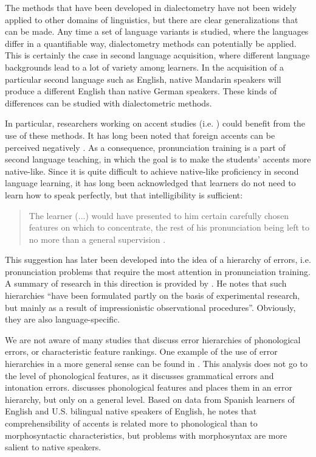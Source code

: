 \documentclass[output=paper]{LSP/langsci}
\begin{document}
The methods that have been developed in dialectometry have not been widely applied to other domains of linguistics, but there are clear generalizations that can be made. Any time a set of language variants is studied, where the languages differ in a quantifiable way, dialectometry methods can potentially be applied. This is certainly the case in second language acquisition, where different language backgrounds lead to a lot of variety among learners. In the acquisition of a particular second language such as English, native Mandarin speakers will produce a different English than native German speakers. These kinds of differences can be studied with dialectometric methods.

In particular, researchers working on accent studies (i.e. \citealt{wells_accents_1982, waniek-klimczak_issues_2008}) could benefit from the use of these methods. It has long been noted that foreign accents can be perceived negatively \citep{ryan_social_1983}. As a consequence, pronunciation training is a part of second language teaching, in which the goal is to make the students' accents more native-like. Since it is quite difficult to achieve native-like proficiency in second language learning, it has long been acknowledged that learners do not need to learn how to speak perfectly, but that intelligibility is sufficient:
\begin{quote}
The learner (...) would have presented to him certain carefully chosen features on which to concentrate, the rest of his pronunciation being left to no more than a general supervision \citep[93]{abercrombie_problems_1956}.
\end{quote}
This suggestion has later been developed into the idea of a hierarchy of errors, i.e. pronunciation problems that require the most attention in pronunciation training. A summary of research in this direction is provided by \citet[7-15]{van_den_doel_evaluation_2006}. He notes that such hierarchies ``have been formulated partly on the basis of experimental research, but mainly as a result of impressionistic observational procedures''. Obviously, they are also language-specific.

We are not aware of many studies that discuss error hierarchies of phonological errors, or characteristic feature rankings. One example of the use of error hierarchies in a more general sense can be found in \citet{rifkin_error_1995}. This analysis does not go to the level of phonological features, as it discusses grammatical errors and intonation errors. \citet{gynan_comprehension_1985} discusses phonological features and places them in an error hierarchy, but only on a general level. Based on data from Spanish learners of English and U.S. bilingual native speakers of English, he notes that comprehensibility of accents is related more to phonological than to morphosyntactic characteristics, but problems with morphosyntax are more salient to native speakers.
\end{document}
